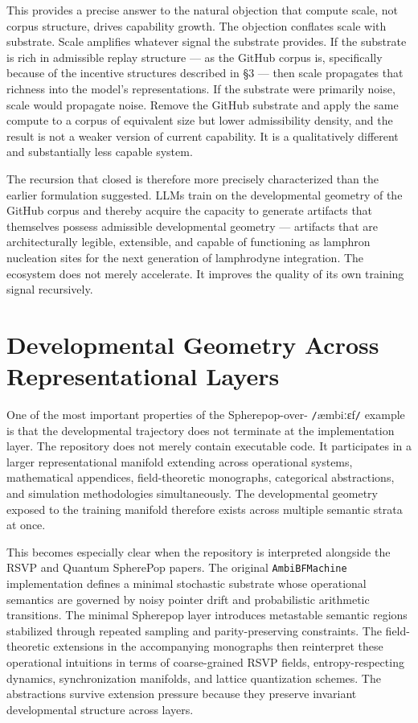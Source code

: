 \documentclass[12pt]{article}
\newcommand{\ambibf}{%
  \texttt{/}\textnormal{æmbiːɛf}\texttt{/}%
}
\begin{document}
This provides a precise answer to the natural objection that compute scale, not
corpus structure, drives capability growth. The objection conflates scale with
substrate. Scale amplifies whatever signal the substrate provides. If the
substrate is rich in admissible replay structure --- as the GitHub corpus is,
specifically because of the incentive structures described in \S3 --- then scale
propagates that richness into the model's representations. If the substrate were
primarily noise, scale would propagate noise. Remove the GitHub substrate and
apply the same compute to a corpus of equivalent size but lower admissibility
density, and the result is not a weaker version of current capability. It is a
qualitatively different and substantially less capable system.

The recursion that closed is therefore more precisely characterized than the
earlier formulation suggested. LLMs train on the developmental geometry of the
GitHub corpus and thereby acquire the capacity to generate artifacts that
themselves possess admissible developmental geometry --- artifacts that are
architecturally legible, extensible, and capable of functioning as lamphron
nucleation sites for the next generation of lamphrodyne integration. The
ecosystem does not merely accelerate. It improves the quality of its own
training signal recursively.

\section{Developmental Geometry Across Representational Layers}

One of the most important properties of the Spherepop-over-%
\ambibf{} example is that the
developmental trajectory does not terminate at the implementation layer. The
repository does not merely contain executable code. It participates in a larger
representational manifold extending across operational systems, mathematical
appendices, field-theoretic monographs, categorical abstractions, and simulation
methodologies simultaneously. The developmental geometry exposed to the training
manifold therefore exists across multiple semantic strata at once.

This becomes especially clear when the repository is interpreted alongside the
RSVP and Quantum SpherePop papers. The original \texttt{AmbiBFMachine}
implementation defines a minimal stochastic substrate whose operational semantics
are governed by noisy pointer drift and probabilistic arithmetic transitions.
The minimal Spherepop layer introduces metastable semantic regions stabilized
through repeated sampling and parity-preserving constraints. The field-theoretic
extensions in the accompanying monographs then reinterpret these operational
intuitions in terms of coarse-grained RSVP fields, entropy-respecting dynamics,
synchronization manifolds, and lattice quantization schemes. The abstractions
survive extension pressure because they preserve invariant developmental
structure across layers.
\end{document}
